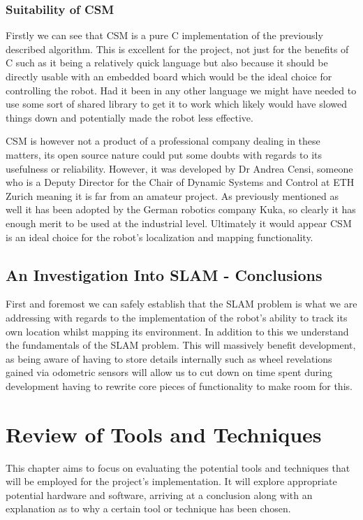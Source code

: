 			\subsection{Suitability of CSM}
			Firstly we can see that CSM is a pure C implementation of the previously described algorithm. This is excellent for the project, not just for the benefits of C such as it being a relatively quick language but also because it should be directly usable with an embedded board which would be the ideal choice for controlling the robot. Had it been in any other language we might have needed to use some sort of shared library to get it to work which likely would have slowed things down and potentially made the robot less effective. 
			
			CSM is however not a product of a professional company dealing in these matters, its open source nature could put some doubts with regards to its usefulness or reliability. However, it was developed by Dr Andrea Censi, someone who is a Deputy Director for the Chair of Dynamic Systems and Control at ETH Zurich meaning it is far from an amateur project. As previously mentioned as well it has been adopted by the German robotics company Kuka, so clearly it has enough merit to be used at the industrial level. Ultimately it would appear CSM is an ideal choice for the robot's localization and mapping functionality.
					
			\section{An Investigation Into SLAM - Conclusions}	
			First and foremost we can safely establish that the SLAM problem is what we are addressing with regards to the implementation of the robot's ability to track its own location whilst mapping its environment. In addition to this we understand the fundamentals of the SLAM problem. This will massively benefit development, as being aware of having to store details internally such as wheel revelations gained via odometric sensors will allow us to cut down on time spent during development having to rewrite core pieces of functionality to make room for this. 

		
		
		\chapter{Review of Tools and Techniques}
		This chapter aims to focus on evaluating the potential tools and techniques that will be employed for the project's implementation. It will explore appropriate potential hardware and software, arriving at a conclusion along with an explanation as to why a certain tool or technique has been chosen.
